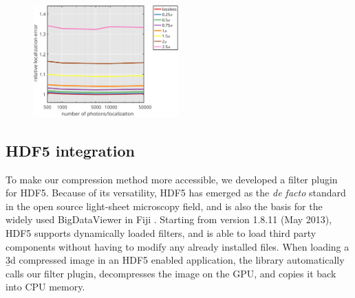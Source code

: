     \begin{figure}[tpb]
      \centering
      \includegraphics[page=1,width=0.5\textwidth]{SFig6_locprecVsNphotons}
      \label{fig:SFig6_locprecVsNphotons}
    \end{figure}



  

  \subsection{HDF5 integration}
  To make our compression method more accessible, we developed a filter plugin for HDF5. Because of its versatility, HDF5 has emerged as the \textit{de facto} standard in the open source light-sheet microscopy field, and is also the basis for the widely used BigDataViewer \cite{pietzsch_bigdataviewer:_2015} in Fiji \cite{schindelin_fiji:_2012}. Starting from version 1.8.11 (May 2013), HDF5 supports dynamically loaded filters, and is able to load third party components without having to modify any already installed files. When loading a \b3d compressed image in an HDF5 enabled application, the library automatically calls our filter plugin, decompresses the image on the GPU, and copies it back into CPU memory.
  
